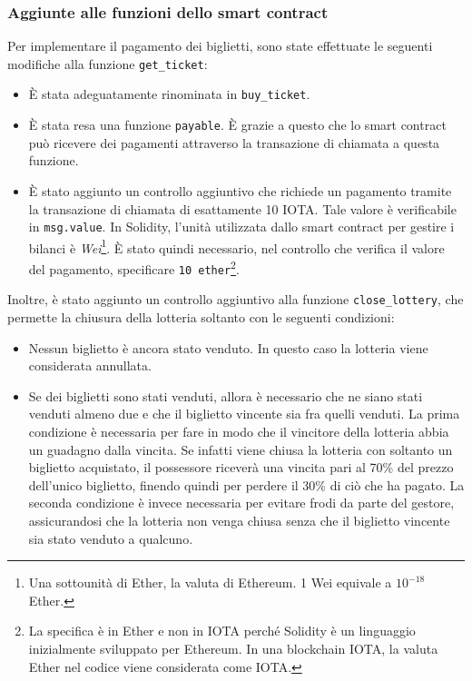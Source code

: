 \documentclass[12pt,a4paper,openright,twoside]{report}
\begin{document}
\subsubsection{Aggiunte alle funzioni dello smart contract}
Per implementare il pagamento dei biglietti, sono state effettuate le seguenti modifiche alla funzione \texttt{get\_ticket}:
\begin{itemize}\label{contract_payments}
    \item È stata adeguatamente rinominata in \texttt{buy\_ticket}.
    \item È stata resa una funzione \texttt{payable}. È grazie a questo che lo smart contract può ricevere dei pagamenti attraverso la transazione di chiamata a questa funzione.
    \item È stato aggiunto un controllo aggiuntivo che richiede un pagamento tramite la transazione di chiamata di esattamente 10 IOTA. Tale valore è verificabile in \texttt{msg.value}. In Solidity, l'unità utilizzata dallo smart contract per gestire i bilanci è \textit{Wei}\footnote{Una sottounità di Ether, la valuta di Ethereum. 1 Wei equivale a \(10^{-18}\) Ether.}. È stato quindi necessario, nel controllo che verifica il valore del pagamento, specificare \texttt{10 ether}\footnote{La specifica è in Ether e non in IOTA perché Solidity è un linguaggio inizialmente sviluppato per Ethereum. In una blockchain IOTA, la valuta Ether nel codice viene considerata come IOTA.}. 
    \end{itemize}
\label{close_lottery}Inoltre, è stato aggiunto un controllo aggiuntivo alla funzione \texttt{close\_lottery}, che permette la chiusura della lotteria soltanto con le seguenti condizioni:
\begin{itemize}
    \item Nessun biglietto è ancora stato venduto. In questo caso la lotteria viene considerata annullata.
    \item Se dei biglietti sono stati venduti, allora è necessario che ne siano stati venduti almeno due e che il biglietto vincente sia fra quelli venduti. La prima condizione è necessaria per fare in modo che il vincitore della lotteria abbia un guadagno dalla vincita. Se infatti viene chiusa la lotteria con soltanto un biglietto acquistato, il possessore riceverà una vincita pari al 70\% del prezzo dell'unico biglietto, finendo quindi per perdere il 30\% di ciò che ha pagato. La seconda condizione è invece necessaria per evitare frodi da parte del gestore, assicurandosi che la lotteria non venga chiusa senza che il biglietto vincente sia stato venduto a qualcuno.
\end{itemize}
\end{document}
